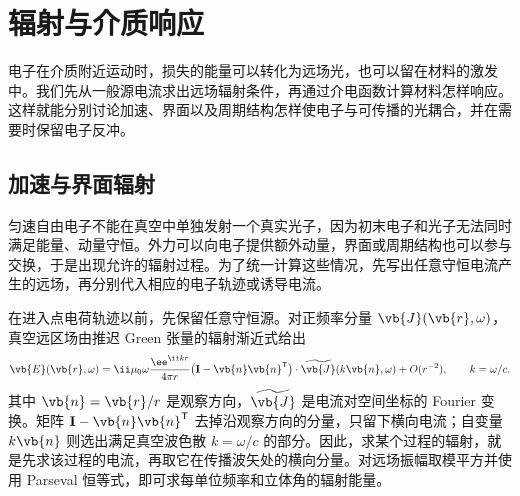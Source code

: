 \section{辐射与介质响应}

电子在介质附近运动时，损失的能量可以转化为远场光，也可以留在材料的激发中。我们先从一般源电流求出远场辐射条件，再通过介电函数计算材料怎样响应。这样就能分别讨论加速、界面以及周期结构怎样使电子与可传播的光耦合，并在需要时保留电子反冲。

\subsection{加速与界面辐射}

匀速自由电子不能在真空中单独发射一个真实光子，因为初末电子和光子无法同时满足能量、动量守恒。外力可以向电子提供额外动量，界面或周期结构也可以参与交换，于是出现允许的辐射过程。为了统一计算这些情况，先写出任意守恒电流产生的远场，再分别代入相应的电子轨迹或诱导电流。

在进入点电荷轨迹以前，先保留任意守恒源。对正频率分量 $\vb{J}(\vb{r},\omega)$，真空远区场由推迟 Green 张量的辐射渐近式给出
\begin{equation}
{
\vb{E}(\vb{r},\omega)
=
\ii\mu_0\omega\frac{\ee^{\ii k r}}{4\pi r}
\bigl(\mathbf I-\vb{n}\vb{n}^{\mathsf T}\bigr)
\cdot\widetilde{\vb{J}}(k\vb{n},\omega)
+O(r^{-2}),
\qquad k=\omega/c.}
\label{eq:general_current_far_field_radiation}
\end{equation}
其中 $\vb{n}=\vb{r}/r$ 是观察方向，$\widetilde{\vb{J}}$ 是电流对空间坐标的 Fourier 变换。矩阵 $\mathbf I-\vb{n}\vb{n}^{\mathsf T}$ 去掉沿观察方向的分量，只留下横向电流；自变量 $k\vb{n}$ 则选出满足真空波色散 $k=\omega/c$ 的部分。因此，求某个过程的辐射，就是先求该过程的电流，再取它在传播波矢处的横向分量。对远场振幅取模平方并使用 Parseval 恒等式，即可求每单位频率和立体角的辐射能量。

